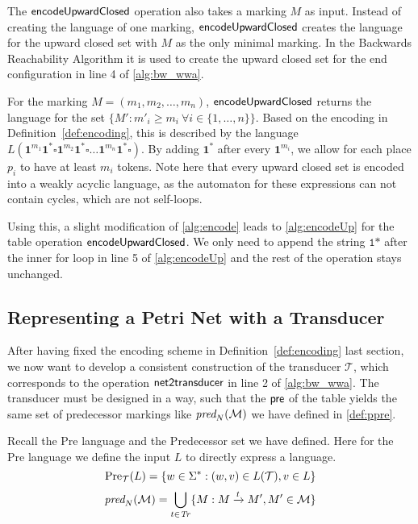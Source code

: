 The $\operatorname{\textsf{encodeUpwardClosed}}$ operation also takes a marking $M$ as input. Instead of creating the language of one marking, $\operatorname{\textsf{encodeUpwardClosed}}$ creates the language for the upward closed set with $M$ as the only minimal marking. In the Backwards Reachability Algorithm it is used to create the upward closed set for the end configuration  in line 4 of \autoref{alg:bw_wwa}.
\par
For the marking $M=(m_{1},m_{2},\dots,m_{n})$, $\operatorname{\textsf{encodeUpwardClosed}}$ returns the language for the set $\{M': m'_{i} \ge m_{i} \ \forall i \in \{1,\dots,n\}\}$. Based on the encoding in Definition~\autoref{def:encoding}, this is described by the language $L(\bm{1}^{m_{1}}\bm{1^{*}} \square \bm{1}^{m_{2}}\bm{1^{*}} \square \ldots \bm{1}^{m_{n}}\bm{1^{*}} \square)$. 
By adding $\bm{1^{*}}$ after every $\bm{1}^{m_{i}}$, we allow for each place $p_{i}$ to have at least $m_{i}$ tokens. Note here that every upward closed set is encoded into a weakly acyclic language, as the automaton for these expressions can not contain cycles, which are not self-loops.
\par
Using this, a slight modification of \autoref{alg:encode} leads to \autoref{alg:encodeUp} for the table operation $\operatorname{\textsf{encodeUpwardClosed}}$. We only need to append the string $\texttt{1*}$ after the inner for loop in line 5 of \autoref{alg:encodeUp} and the rest of the operation stays unchanged. 

\subsection{Representing a Petri Net with a Transducer}
After having fixed the encoding scheme in Definition~\autoref{def:encoding} last section, we now want to develop a consistent construction  of the transducer $\mathcal{T}$, which corresponds to the operation $\operatorname{\textsf{net2transducer}}$ in line 2 of \autoref{alg:bw_wwa}. 
The transducer must be designed in a way, such that the $\operatorname{\textsf{pre}}$ of the table yields the same set of predecessor markings like $\operatorname{\textit{pred}}_{N}(\mathcal{M})$  we have defined in \autoref{def:ppre}.

\par

Recall the Pre language and the Predecessor set we have defined. Here for the Pre language we define the input $L$ to directly express a language.
\begin{equation*}
\operatorname{\text{Pre}}_{\mathcal{T}}(L) = \{ w \in \Sigma^{*}: (w,v) \in L(\mathcal{T}), v \in L \} 
\end{equation*}
\begin{equation*}
\operatorname{\textit{pred}}_{N}(\mathcal{M}) = \bigcup_{t \in \mathit{Tr}} \{M : M \xrightarrow{t} M', M' \in \mathcal{M} \}
\end{equation*}

